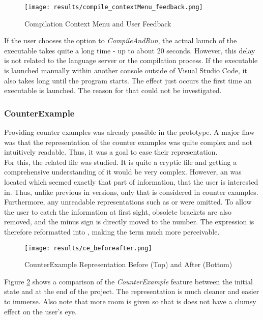 \begin{figure}[H]
    \centering
    \texttt{[image: results/compile\_contextMenu\_feedback.png]}
    \caption{Compilation Context Menu and User Feedback}
    \label{fig:compilation_stuff}
\end{figure}


If the user chooses the option to \textit{CompileAndRun}, the actual launch of the executable takes quite a long time - up to about 20 seconds.
However, this delay is not related to the language server or the compilation process.
If the executable is launched manually within another console outside of Visual Studio Code, it also takes long until the program starts.
The effect just occurs the first time an executable is launched.
The reason for that could not be investigated.

\subsubsection{CounterExample}
Providing counter examples was already possible in the prototype.
A major flaw was that the representation of the counter examples was quite complex and not intuitively readable.
Thus, it was a goal to ease their representation.\\

For this, the related  file was studied.
It is quite a  cryptic file and getting a comprehensive understanding of it would be very complex.
However, an  was located which seemed exactly that part of information, that the user is interested in.
Thus, unlike previous in versions, only that  is considered in counter examples.
Furthermore, any unreadable representations such as  or  were omitted.
To allow the user to catch the information at first sight, obsolete brackets are also removed, and the minus sign is directly moved to the number.
The expression  is therefore reformatted into , making the term much more perceivable.

\begin{figure}[H]
    \centering
    \texttt{[image: results/ce\_beforeafter.png]}
    \caption{CounterExample Representation Before (Top) and After (Bottom)}
    \label{fig:ce_beforeafter}
\end{figure}

Figure \ref{fig:ce_beforeafter} shows a comparison of the
\textit{CounterExample} feature between the initial state and at the end of the project.
The representation is much cleaner and easier to immerse.
Also note that more room is given so that is does not have a clumsy effect on the user's eye. \\

